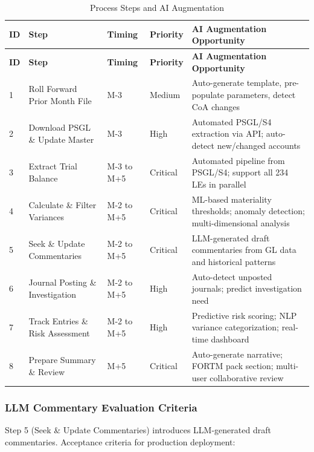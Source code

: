 \documentclass[11pt,a4paper]{article}
\begin{document}
\begin{longtable}{@{}C{0.8cm}L{2.5cm}C{1.5cm}C{1.5cm}L{7cm}@{}}
\caption{Process Steps and AI Augmentation} \\
\toprule
\textbf{ID} & \textbf{Step} & \textbf{Timing} & \textbf{Priority} & \textbf{AI Augmentation Opportunity} \\
\midrule
\endfirsthead
\toprule
\textbf{ID} & \textbf{Step} & \textbf{Timing} & \textbf{Priority} & \textbf{AI Augmentation Opportunity} \\
\midrule
{} & Roll Forward Prior Month File & M-3 & \textcolor{sapblue}{Medium} & Auto-generate template, pre-populate parameters, detect CoA changes \\
2 & Download PSGL \& Update Master & M-3 & \textcolor{sapgold}{High} & Automated PSGL/S4 extraction via API; auto-detect new/changed accounts \\
3 & Extract Trial Balance & M-3 to M+5 & \textcolor{critred}{Critical} & Automated pipeline from PSGL/S4; support all 234 LEs in parallel \\
4 & Calculate \& Filter Variances & M-2 to M+5 & \textcolor{critred}{Critical} & ML-based materiality thresholds; anomaly detection; multi-dimensional analysis \\
5 & Seek \& Update Commentaries & M-2 to M+5 & \textcolor{critred}{Critical} & LLM-generated draft commentaries from GL data and historical patterns \\
6 & Journal Posting \& Investigation & M-2 to M+5 & \textcolor{sapgold}{High} & Auto-detect unposted journals; predict investigation need \\
7 & Track Entries \& Risk Assessment & M-2 to M+5 & \textcolor{sapgold}{High} & Predictive risk scoring; NLP variance categorization; real-time dashboard \\
8 & Prepare Summary \& Review & M+5 & \textcolor{critred}{Critical} & Auto-generate narrative; FORTM pack section; multi-user collaborative review \\
\bottomrule
\end{longtable}

\subsubsection{LLM Commentary Evaluation Criteria}

Step 5 (Seek \& Update Commentaries) introduces LLM-generated draft commentaries. 
Acceptance criteria for production deployment:
\end{document}
